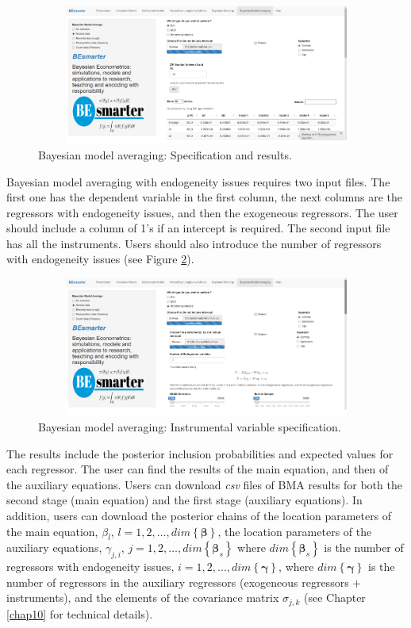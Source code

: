 \begin{figure}
	\includegraphics[width=340pt, height=130pt]{Chapters/chapterGUI/figures/Figure9.png}
	\caption[List of figure caption goes here]{Bayesian model averaging: Specification and results.}\label{fig69}
\end{figure} 

Bayesian model averaging with endogeneity issues requires two input files. The first one has the dependent variable in the first column, the next columns are the regressors with endogeneity issues, and then the exogeneous regressors. The user should include a column of 1's if an intercept is required. The second input file has all the instruments. Users should also introduce the number of regressors with endogeneity issues (see Figure \ref{fig610}).

\begin{figure}
	\includegraphics[width=340pt, height=130pt]{Chapters/chapterGUI/figures/Figure10.png}
	\caption[List of figure caption goes here]{Bayesian model averaging: Instrumental variable specification.}\label{fig610}
\end{figure} 

The results include the posterior inclusion probabilities and expected values for each regressor. The user can find the results of the main equation, and then of the auxiliary equations. Users can download \textit{csv} files of BMA results for both the second stage (main equation)  and the first stage (auxiliary equations). In addition, users can download the posterior chains of the location parameters of the main equation, $\beta_{l}$, $l=1,2,\dots,dim\left\{\bm{\beta}\right\}$, the location parameters of the auxiliary equations, $\gamma_{j,i}$, $j=1,2,\dots,dim\left\{\bm{\beta}_s\right\}$ where $dim\left\{\bm{\beta}_s\right\}$ is the number of regressors with endogeneity issues, $i=1,2,\dots,dim\left\{\bm{\gamma}\right\}$, where $dim\left\{\bm{\gamma}\right\}$ is the number of regressors in the auxiliary regressors (exogeneous regressors + instruments), and the elements of the covariance matrix $\sigma_{j,k}$ (see Chapter \ref{chap10} for technical details).


